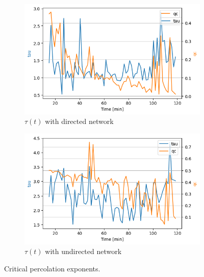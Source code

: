 \begin{figure}
\centering
\begin{subfigure}[b]{0.7\linewidth}
    \centering
    \includegraphics[width=\linewidth]{images/tau_qc_base2.png}
    \caption{$\tau(t)$ with directed network}
    \label{fig: tau dir}
\end{subfigure}
\begin{subfigure}[b]{0.7\linewidth}
    \centering
    \includegraphics[width=\linewidth]{images/tau_qc_undir_base2.png}
    \caption{$\tau(t)$ with undirected network}
    \label{fig: tau undir}
\end{subfigure}
\caption{Critical percolation exponents.}
\label{fig: tau plots}
\end{figure}


